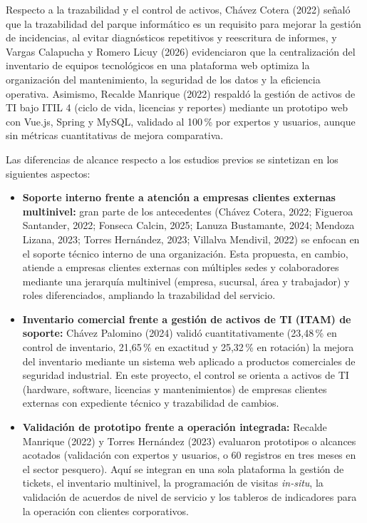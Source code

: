 Respecto a la trazabilidad y el control de activos, Chávez Cotera (2022) señaló que la trazabilidad del parque informático es un requisito para mejorar la gestión de incidencias, al evitar diagnósticos repetitivos y reescritura de informes, y Vargas Calapucha y Romero Licuy (2026) evidenciaron que la centralización del inventario de equipos tecnológicos en una plataforma web optimiza la organización del mantenimiento, la seguridad de los datos y la eficiencia operativa. Asimismo, Recalde Manrique (2022) respaldó la gestión de activos de TI bajo ITIL 4 (ciclo de vida, licencias y reportes) mediante un prototipo web con Vue.js, Spring y MySQL, validado al 100\,\% por expertos y usuarios, aunque sin métricas cuantitativas de mejora comparativa.

Las diferencias de alcance respecto a los estudios previos se sintetizan en los siguientes aspectos:

\begin{itemize}[leftmargin=1.27cm]
    \item \textbf{Soporte interno frente a atención a empresas clientes externas multinivel:} gran parte de los antecedentes (Chávez Cotera, 2022; Figueroa Santander, 2022; Fonseca Calcin, 2025; Lanuza Bustamante, 2024; Mendoza Lizana, 2023; Torres Hernández, 2023; Villalva Mendivil, 2022) se enfocan en el soporte técnico interno de una organización. Esta propuesta, en cambio, atiende a empresas clientes externas con múltiples sedes y colaboradores mediante una jerarquía multinivel (empresa, sucursal, área y trabajador) y roles diferenciados, ampliando la trazabilidad del servicio.

    \item \textbf{Inventario comercial frente a gestión de activos de TI (ITAM) de soporte:} Chávez Palomino (2024) validó cuantitativamente (23,48\,\% en control de inventario, 21,65\,\% en exactitud y 25,32\,\% en rotación) la mejora del inventario mediante un sistema web aplicado a productos comerciales de seguridad industrial. En este proyecto, el control se orienta a activos de TI (hardware, software, licencias y mantenimientos) de empresas clientes externas con expediente técnico y trazabilidad de cambios.

    \item \textbf{Validación de prototipo frente a operación integrada:} Recalde Manrique (2022) y Torres Hernández (2023) evaluaron prototipos o alcances acotados (validación con expertos y usuarios, o 60 registros en tres meses en el sector pesquero). Aquí se integran en una sola plataforma la gestión de tickets, el inventario multinivel, la programación de visitas \textit{in-situ}, la validación de acuerdos de nivel de servicio y los tableros de indicadores para la operación con clientes corporativos.
\end{itemize}

